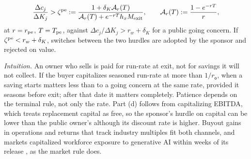 \begin{proposition}
\begin{enumerate}
\begin{equation}\label{eq:reg-zeta}
\frac{\Delta c_j}{\Delta K_j}>\zeta^{\rm pe}:=\frac{1+\delta_K\mathcal A_r(T)}{\mathcal A_r(T)+e^{-rT}h_xM_{\rm exit}},\qquad \mathcal A_r(T):=\frac{1-e^{-rT}}{r},
\end{equation}
at $r=r_{\rm pe}$, $T=T_{\rm pe}$, against $\Delta c_j/\Delta K_j>r_w+\delta_K$ for a public going concern. If $\zeta^{\rm pe}<r_w+\delta_K$, switches between the two hurdles are adopted by the sponsor and rejected on value.
\end{enumerate}
\end{proposition}

\noindent\emph{Intuition.} An owner who sells is paid for run-rate at exit, not for savings it will not collect. If the buyer capitalizes seasoned run-rate at more than $1/r_{\mathsf o}$, when a saving starts matters less than to a going concern at the same rate, provided it seasons before exit; after that date it matters completely. Patience depends on the terminal rule, not only the rate. Part (d) follows from capitalizing EBITDA, which treats replacement capital as free, so the sponsor's hurdle on capital can be lower than the public owner's although its discount rate is higher. Buyout gains in operations and returns that track industry multiples \citep{guo2011do} fit both channels, and markets capitalized workforce exposure to generative AI within weeks of its release \citep[a working paper]{eisfeldt2023generative}, as the market rule does.

